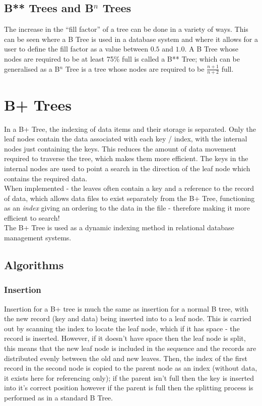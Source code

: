 \subsection{B** Trees and B$^n$ Trees}
The increase in the ``fill factor'' of a tree can be done in a variety of ways. This can be seen where a B Tree is used in a database system and where it allows for a user to define the fill factor as a value between $0.5$ and $1.0$. A B Tree whose nodes are required to be at least 75\% full is called a B** Tree; which can be generalised as a B$^n$ Tree is a tree whose nodes are required to be $\displaystyle \frac{n+1}{n+2}$ full. 

\section{B+ Trees}
In a B+ Tree, the indexing of data items and their storage is separated. Only the leaf nodes contain the data associated with each key / index, with the internal nodes just containing the keys. This reduces the amount of data movement required to traverse the tree, which makes them more efficient. The keys in the internal nodes are used to point a search in the direction of the leaf node which contains the required data.\\

When implemented - the leaves often contain a key and a reference to the record of data, which allows data files to exist separately from the B+ Tree, functioning as an \textit{index} giving an ordering to the data in the file - therefore making it more efficient to search!\\

The B+ Tree is used as a dynamic indexing method in relational database management systems.

\subsection{Algorithms}
\subsubsection{Insertion}
Insertion for a B+ tree is much the same as insertion for a normal B tree, with the new record (key and data) being inserted into to a leaf node. This is carried out by scanning the index to locate the leaf node, which if it has space - the record is inserted. However, if it doesn't have space then the leaf node is split, this means that the new leaf node is included in the sequence and the records are distributed evenly between the old and new leaves. Then, the index of the first record in the second node is copied to the parent node as an index (without data, it exists here for referencing only); if the parent isn't full then the key is inserted into it's correct position however if the parent is full then the splitting process is performed as in a standard B Tree. 
